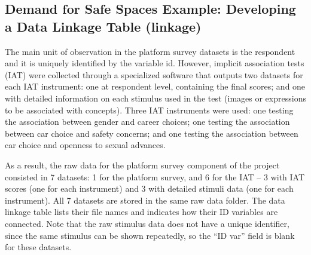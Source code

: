 \documentclass[
]{book}
\begin{document}
\begin{ex}
\hypertarget{demand-for-safe-spaces-example-developing-a-data-linkage-table-linkage}{%
\subsection{Demand for Safe Spaces Example: Developing a Data Linkage Table (linkage)}\label{demand-for-safe-spaces-example-developing-a-data-linkage-table-linkage}}

The main unit of observation in the platform survey datasets is the respondent and it is uniquely identified by the variable id. However, implicit association tests (IAT) were collected through a specialized software that outputs two datasets for each IAT instrument: one at respondent level, containing the final scores; and one with detailed information on each stimulus used in the test (images or expressions to be associated with concepts). Three IAT instruments were used: one testing the association between gender and career choices; one testing the association between car choice and safety concerns; and one testing the association between car choice and openness to sexual advances.

As a result, the raw data for the platform survey component of the project consisted in 7 datasets: 1 for the platform survey, and 6 for the IAT -- 3 with IAT scores (one for each instrument) and 3 with detailed stimuli data (one for each instrument). All 7 datasets are stored in the same raw data folder. The data linkage table lists their file names and indicates how their ID variables are connected. Note that the raw stimulus data does not have a unique identifier, since the same stimulus can be shown repeatedly, so the ``ID var'' field is blank for these datasets.


\end{ex}
\end{document}
